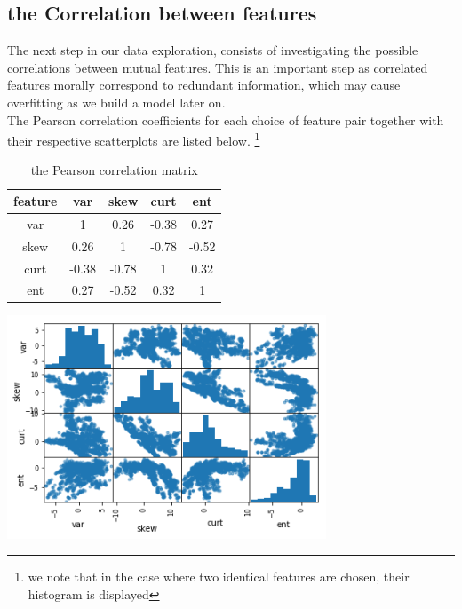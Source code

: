 \documentclass[14pt]{article}
\theoremstyle{plain}
\theoremstyle{definition}
\begin{document}
\subsection{the Correlation between features} The next step in our data exploration, consists of investigating the possible correlations between mutual features. This is an important step as correlated features morally correspond to redundant information, which may cause overfitting as we build a model later on.\\ The Pearson correlation coefficients for each choice of feature pair together with their respective scatterplots  are listed below. \footnote{we note that in the case where two identical features are chosen, their histogram is displayed}
\begin{table}[ht]
\begin{minipage}[b]{0.4\linewidth}
\centering
\begin{tabular}{|c |c| c| c |c |}
\hline
feature  &         var   &   skew &     curt    &   ent\\
  \hline
var &   1 & 0.26 & -0.38 & 0.27\\
\hline
skew & 0.26 & 1 & -0.78 & -0.52\\
\hline
curt & -0.38 & -0.78 &  1  & 0.32\\
\hline
ent   & 0.27 & -0.52 &  0.32 &  1\\
\hline
\end{tabular}
\vspace{0.83in}
 \caption{the Pearson correlation matrix}
    \label{table:student}
\end{minipage}
\begin{minipage}[b]{0.445\linewidth}
\centering
\includegraphics[width=95mm]{banknote_forgery_files/banknote_forgery_15_1}
\label{boxplot}
\end{minipage}
\end{table}
\end{document}
